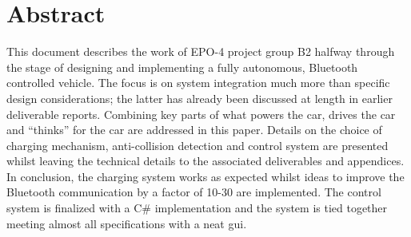 \documentclass[11pt,titlepage]{report}
\begin{document}
\section*{Abstract}
This document describes the work of EPO-4 project group B2 halfway through the stage of designing and implementing a fully autonomous, Bluetooth controlled vehicle. The focus is on system integration much more than specific design considerations; the latter has already been discussed at length in earlier deliverable reports. Combining key parts of what powers the car, drives the car and ``thinks'' for the car are addressed in this paper. Details on the choice of charging mechanism, anti-collision detection and control system are presented whilst leaving the technical details to the associated deliverables and appendices. In conclusion, the charging system works as expected whilst ideas to improve the Bluetooth communication by a factor of 10-30 are implemented. The control system is finalized with a C\# implementation and the system is tied together meeting almost all specifications with a neat gui.
\end{document}
